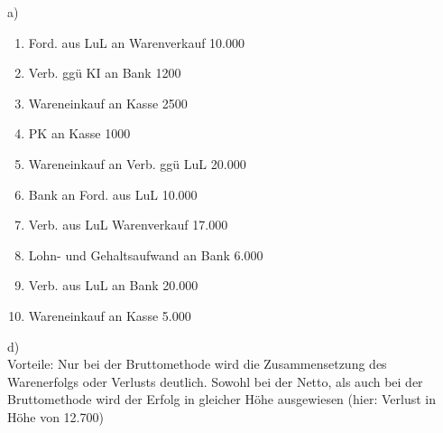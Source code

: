\documentclass[paper=a4, fontsize=11pt]{scrartcl}
\numberwithin{equation}{section}
\numberwithin{figure}{section}
\numberwithin{table}{section}
\begin{document}
a) 
\begin{enumerate}
\item Ford. aus LuL an Warenverkauf 10.000
\item Verb. ggü KI an Bank 1200
\item Wareneinkauf an Kasse 2500
\item PK an Kasse 1000
\item Wareneinkauf an Verb. ggü LuL 20.000
\item Bank an Ford. aus LuL 10.000
\item Verb. aus LuL Warenverkauf 17.000
\item Lohn- und Gehaltsaufwand an Bank 6.000
\item Verb. aus LuL an Bank 20.000
\item Wareneinkauf an Kasse 5.000
\end{enumerate}

d) \\
Vorteile: Nur bei der Bruttomethode wird die Zusammensetzung des Warenerfolgs oder Verlusts deutlich. Sowohl bei der Netto, als auch bei der Bruttomethode wird der Erfolg in gleicher Höhe ausgewiesen (hier: Verlust in Höhe von 12.700)
\end{document}
